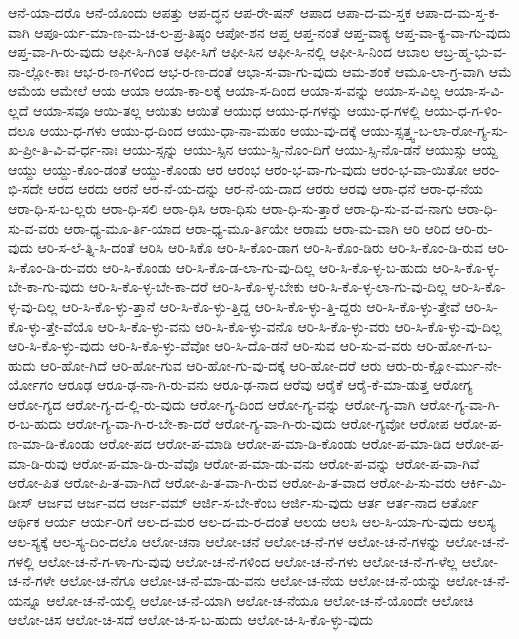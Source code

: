 {ಆನೆ-ಯಾ-ದರೊ
ಆನೆ-ಯೊಂದು
ಆಪತ್ತು
ಆಪ-ದ್ಧನ
ಆಪ-ರೇ-ಷನ್
ಆಪಾದ
ಆಪಾ-ದ-ಮ-ಸ್ತಕ
ಆಪಾ-ದ-ಮ-ಸ್ತ-ಕ-ವಾಗಿ
ಆಪೂ-ರ್ಯ-ಮಾ-ಣ-ಮ-ಚ-ಲ-ಪ್ರ-ತಿಷ್ಠಂ
ಆಪೋ-ಶನ
ಆಪ್ತ
ಆಪ್ತ-ನಂತೆ
ಆಪ್ತ-ವಾಕ್ಯ
ಆಪ್ತ-ವಾ-ಕ್ಯ-ವಾ-ಗು-ವುದು
ಆಪ್ತ-ವಾ-ಗಿ-ರು-ವುದು
ಆಫೀ-ಸಿ-ಗಿಂತ
ಆಫೀ-ಸಿಗೆ
ಆಫೀ-ಸಿನ
ಆಫೀ-ಸಿ-ನಲ್ಲಿ
ಆಫೀ-ಸಿ-ನಿಂದ
ಆಬಾಲ
ಆಬ್ರ-ಹ್ಮ-ಭು-ವ-ನಾ-ಲ್ಲೋ-ಕಾಃ
ಆಭ-ರ-ಣ-ಗಳಿಂದ
ಆಭ-ರ-ಣ-ದಂತೆ
ಆಭಾ-ಸ-ವಾ-ಗು-ವುದು
ಆಮ-ಶಂಕೆ
ಆಮೂ-ಲಾ-ಗ್ರ-ವಾಗಿ
ಆಮೆ
ಆಮೆಯ
ಆಮೇಲೆ
ಆಯ
ಆಯಾ
ಆಯಾ-ಕಾ-ಲಕ್ಕೆ
ಆಯಾ-ಸ-ದಿಂದ
ಆಯಾ-ಸ-ವನ್ನು
ಆಯಾ-ಸ-ವಿಲ್ಲ
ಆಯಾ-ಸ-ವಿ-ಲ್ಲದೆ
ಆಯಾ-ಸವೂ
ಆಯಿ-ತಲ್ಲ
ಆಯಿತು
ಆಯಿತೆ
ಆಯುಧ
ಆಯು-ಧ-ಗಳನ್ನು
ಆಯು-ಧ-ಗಳಲ್ಲಿ
ಆಯು-ಧ-ಗ-ಳಿಂ-ದಲೂ
ಆಯು-ಧ-ಗಳು
ಆಯು-ಧ-ದಿಂದ
ಆಯು-ಧಾ-ನಾ-ಮಹಂ
ಆಯು-ವು-ದಕ್ಕೆ
ಆಯು-ಸ್ಸತ್ತ್ವ-ಬ-ಲಾ-ರೋ-ಗ್ಯ-ಸು-ಖ-ಪ್ರೀ-ತಿ-ವಿ-ವ-ರ್ಧ-ನಾಃ
ಆಯು-ಸ್ಸನ್ನು
ಆಯು-ಸ್ಸಿನ
ಆಯು-ಸ್ಸಿ-ನೊಂ-ದಿಗೆ
ಆಯು-ಸ್ಸಿ-ನೊ-ಡನೆ
ಆಯುಸ್ಸು
ಆಯ್ದ
ಆಯ್ದು
ಆಯ್ದು-ಕೊಂ-ಡಂತೆ
ಆಯ್ದು-ಕೊಂಡು
ಆರ
ಆರಂಭ
ಆರಂ-ಭ-ವಾ-ಗು-ವುದು
ಆರಂ-ಭ-ವಾ-ಯಿತೋ
ಆರಂ-ಭಿ-ಸದೇ
ಆರದ
ಆರದು
ಆರನೆ
ಆರ-ನೆ-ಯ-ದನ್ನು
ಆರ-ನೆ-ಯ-ದಾದ
ಆರರು
ಆರವು
ಆರಾ-ಧನೆ
ಆರಾ-ಧ-ನೆಯ
ಆರಾ-ಧಿ-ಸ-ಬ-ಲ್ಲರು
ಆರಾ-ಧಿ-ಸಲಿ
ಆರಾ-ಧಿಸಿ
ಆರಾ-ಧಿಸು
ಆರಾ-ಧಿ-ಸು-ತ್ತಾರೆ
ಆರಾ-ಧಿ-ಸು-ವ-ವ-ನಾಗು
ಆರಾ-ಧಿ-ಸು-ವ-ವರು
ಆರಾ-ಧ್ಯ-ಮೂ-ರ್ತಿ-ಯಾದ
ಆರಾ-ಧ್ಯ-ಮೂ-ರ್ತಿಯೇ
ಆರಾಮ
ಆರಾ-ಮ-ವಾಗಿ
ಆರಿ
ಆರಿದ
ಆರಿ-ರು-ವುದು
ಆರಿ-ಸ-ಲೆ-ತ್ನಿ-ಸಿ-ದಂತೆ
ಆರಿಸಿ
ಆರಿ-ಸಿಕೊ
ಆರಿ-ಸಿ-ಕೊಂ-ಡಾಗ
ಆರಿ-ಸಿ-ಕೊಂ-ಡಿರು
ಆರಿ-ಸಿ-ಕೊಂ-ಡಿ-ರುವ
ಆರಿ-ಸಿ-ಕೊಂ-ಡಿ-ರು-ವರು
ಆರಿ-ಸಿ-ಕೊಂಡು
ಆರಿ-ಸಿ-ಕೊ-ಡ-ಲಾ-ಗು-ವು-ದಿಲ್ಲ
ಆರಿ-ಸಿ-ಕೊ-ಳ್ಳ-ಬ-ಹುದು
ಆರಿ-ಸಿ-ಕೊ-ಳ್ಳ-ಬೇ-ಕಾ-ಗು-ವುದು
ಆರಿ-ಸಿ-ಕೊ-ಳ್ಳ-ಬೇ-ಕಾ-ದರೆ
ಆರಿ-ಸಿ-ಕೊ-ಳ್ಳ-ಬೇಕು
ಆರಿ-ಸಿ-ಕೊ-ಳ್ಳ-ಲಾ-ಗು-ವು-ದಿಲ್ಲ
ಆರಿ-ಸಿ-ಕೊ-ಳ್ಳ-ವು-ದಿಲ್ಲ
ಆರಿ-ಸಿ-ಕೊ-ಳ್ಳು-ತ್ತಾನೆ
ಆರಿ-ಸಿ-ಕೊ-ಳ್ಳು-ತ್ತಿದ್ದ
ಆರಿ-ಸಿ-ಕೊ-ಳ್ಳು-ತ್ತಿ-ದ್ದರು
ಆರಿ-ಸಿ-ಕೊ-ಳ್ಳು-ತ್ತೇವೆ
ಆರಿ-ಸಿ-ಕೊ-ಳ್ಳು-ತ್ತೇ-ವೆಯೊ
ಆರಿ-ಸಿ-ಕೊ-ಳ್ಳು-ವನು
ಆರಿ-ಸಿ-ಕೊ-ಳ್ಳು-ವನೊ
ಆರಿ-ಸಿ-ಕೊ-ಳ್ಳು-ವರು
ಆರಿ-ಸಿ-ಕೊ-ಳ್ಳು-ವು-ದಿಲ್ಲ
ಆರಿ-ಸಿ-ಕೊ-ಳ್ಳು-ವುದು
ಆರಿ-ಸಿ-ಕೊ-ಳ್ಳು-ವೆವೋ
ಆರಿ-ಸಿ-ದೊ-ಡನೆ
ಆರಿ-ಸುವ
ಆರಿ-ಸು-ವ-ವರು
ಆರಿ-ಹೋ-ಗ-ಬ-ಹುದು
ಆರಿ-ಹೋ-ಗಿದೆ
ಆರಿ-ಹೋ-ಗುವ
ಆರಿ-ಹೋ-ಗು-ವು-ದಕ್ಕೆ
ಆರಿ-ಹೋ-ದರೆ
ಆರು
ಆರು-ರು-ಕ್ಷೋ-ರ್ಮು-ನೇ-ರ್ಯೋಗಂ
ಆರೂಢ
ಆರೂ-ಢ-ನಾ-ಗಿ-ರು-ವನು
ಆರೂ-ಢ-ನಾದ
ಆರೆವು
ಆರೈಕೆ
ಆರೈ-ಕೆ-ಮಾ-ಡುತ್ತ
ಆರೋಗ್ಯ
ಆರೋ-ಗ್ಯದ
ಆರೋ-ಗ್ಯ-ದ-ಲ್ಲಿ-ರು-ವುದು
ಆರೋ-ಗ್ಯ-ದಿಂದ
ಆರೋ-ಗ್ಯ-ವನ್ನು
ಆರೋ-ಗ್ಯ-ವಾಗಿ
ಆರೋ-ಗ್ಯ-ವಾ-ಗಿ-ರ-ಬ-ಹುದು
ಆರೋ-ಗ್ಯ-ವಾ-ಗಿ-ರ-ಬೇ-ಕಾ-ದರೆ
ಆರೋ-ಗ್ಯ-ವಾ-ಗಿ-ರು-ವುದು
ಆರೋ-ಗ್ಯವೋ
ಆರೋಪ
ಆರೋ-ಪ-ಣ-ಮಾ-ಡಿ-ಕೊಂಡು
ಆರೋ-ಪದ
ಆರೋ-ಪ-ಮಾಡಿ
ಆರೋ-ಪ-ಮಾ-ಡಿ-ಕೊಂಡು
ಆರೋ-ಪ-ಮಾ-ಡಿದ
ಆರೋ-ಪ-ಮಾ-ಡಿ-ರುವು
ಆರೋ-ಪ-ಮಾ-ಡಿ-ರು-ವೆವೊ
ಆರೋ-ಪ-ಮಾ-ಡು-ವನು
ಆರೋ-ಪ-ವನ್ನು
ಆರೋ-ಪ-ವಾ-ಗಿವೆ
ಆರೋ-ಪಿತ
ಆರೋ-ಪಿ-ತ-ವಾ-ಗಿದೆ
ಆರೋ-ಪಿ-ತ-ವಾ-ಗಿ-ರುವ
ಆರೋ-ಪಿ-ತ-ವಾದ
ಆರೋ-ಪಿ-ಸು-ವರು
ಆರ್ಕಿ-ಮಿ-ಡೀಸ್
ಆರ್ಜವ
ಆರ್ಜ-ವದ
ಆರ್ಜ-ವಮ್
ಆರ್ಜಿ-ಸ-ಬೇ-ಕೆಂಬ
ಆರ್ಜಿ-ಸು-ವುದು
ಆರ್ತ
ಆರ್ತ-ನಾದ
ಆರ್ತೋ
ಆರ್ಥಿಕ
ಆರ್ಯ
ಆರ್ಯ-ರಿಗೆ
ಆಲ-ದ-ಮರ
ಆಲ-ದ-ಮ-ರ-ದಂತೆ
ಆಲಯ
ಆಲಸಿ
ಆಲ-ಸಿ-ಯಾ-ಗು-ವುದು
ಆಲಸ್ಯ
ಆಲ-ಸ್ಯಕ್ಕೆ
ಆಲ-ಸ್ಯ-ದಿಂ-ದಲೊ
ಆಲೋ-ಚನಾ
ಆಲೋ-ಚನೆ
ಆಲೋ-ಚ-ನೆ-ಗಳ
ಆಲೋ-ಚ-ನೆ-ಗಳನ್ನು
ಆಲೋ-ಚ-ನೆ-ಗಳಲ್ಲಿ
ಆಲೋ-ಚ-ನೆ-ಗ-ಳಾ-ಗು-ವುವು
ಆಲೋ-ಚ-ನೆ-ಗಳಿಂದ
ಆಲೋ-ಚ-ನೆ-ಗಳು
ಆಲೋ-ಚ-ನೆ-ಗ-ಳೆಲ್ಲ
ಆಲೋ-ಚ-ನೆ-ಗಳೇ
ಆಲೋ-ಚ-ನೆಗೂ
ಆಲೋ-ಚ-ನೆ-ಮಾ-ಡು-ವನು
ಆಲೋ-ಚ-ನೆಯ
ಆಲೋ-ಚ-ನೆ-ಯನ್ನು
ಆಲೋ-ಚ-ನೆ-ಯನ್ನೂ
ಆಲೋ-ಚ-ನೆ-ಯಲ್ಲಿ
ಆಲೋ-ಚ-ನೆ-ಯಾಗಿ
ಆಲೋ-ಚ-ನೆಯೂ
ಆಲೋ-ಚ-ನೆ-ಯೊಂದೇ
ಆಲೋಚಿ
ಆಲೋ-ಚಿಸ
ಆಲೋ-ಚಿ-ಸದೆ
ಆಲೋ-ಚಿ-ಸ-ಬ-ಹುದು
ಆಲೋ-ಚಿ-ಸಿ-ಕೊ-ಳ್ಳು-ವುದು
}

